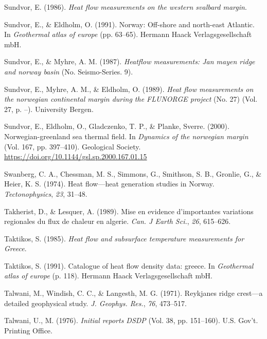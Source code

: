 \begin{CSLReferences}{1}{1}
\leavevmode{}%
Sundvor, E. (1986). \emph{Heat flow measurements on the western svalbard margin}.

\leavevmode{}%
Sundvor, E., \& Eldholm, O. (1991). Norway: Off-shore and north-east {Atlantic}. In \emph{Geothermal atlas of europe} (pp. 63--65). Hermann Haack Verlagsgesellschaft mbH.

\leavevmode{}%
Sundvor, E., \& Myhre, A. M. (1987). \emph{Heatflow measurements: Jan mayen ridge and norway basin} (No. Seismo-Series. 9).

\leavevmode{}%
Sundvor, E., Myhre, A. M., \& Eldholm, O. (1989). \emph{Heat flow measurements on the norwegian continental margin during the FLUNORGE project} (No. 27) (Vol. 27, p. --). University Bergen.

\leavevmode{}%
Sundvor, E., Eldholm, O., Gladczenko, T. P., \& Planke, Sverre. (2000). Norwegian-greenland sea thermal field. In \emph{Dynamics of the norwegian margin} (Vol. 167, pp. 397--410). Geological Society. \url{https://doi.org/10.1144/gsl.sp.2000.167.01.15}

\leavevmode{}%
Swanberg, C. A., Chessman, M. S., Simmons, G., Smithson, S. B., Gronlie, G., \& Heier, K. S. (1974). Heat flow---heat generation studies in {Norway}. \emph{Tectonophysics}, \emph{23}, 31--48.

\leavevmode{}%
Takherist, D., \& Lesquer, A. (1989). Mise en evidence d'importantes variations regionales du flux de chaleur en algerie. \emph{Can. J Earth Sci.}, \emph{26}, 615--626.

\leavevmode{}%
Taktikos, S. (1985). \emph{Heat flow and subsurface temperature measurements for {Greece}}.

\leavevmode{}%
Taktikos, S. (1991). Catalogue of heat flow density data: greece. In \emph{Geothermal atlas of europe} (p. 118). Hermann Haack Verlagsgesellschaft mbH.

\leavevmode{}%
Talwani, M., Windish, C. C., \& Langesth, M. G. (1971). Reykjanes ridge crest---a detailed geophysical study. \emph{J. Geophys. Res.}, \emph{76}, 473--517.

\leavevmode{}%
Talwani, U., M. (1976). \emph{Initial reports DSDP} (Vol. 38, pp. 151--160). U.S. Gov't. Printing Office.


\end{CSLReferences}
